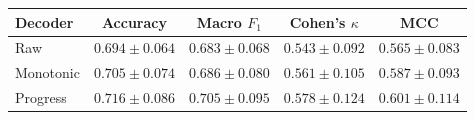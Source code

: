 \begin{tabular}{lcccc}
\toprule
Decoder & Accuracy & Macro $F_1$ & Cohen's $\kappa$ & MCC \\
\midrule
Raw & $0.694 \pm 0.064$ & $0.683 \pm 0.068$ & $0.543 \pm 0.092$ & $0.565 \pm 0.083$ \\
Monotonic & $0.705 \pm 0.074$ & $0.686 \pm 0.080$ & $0.561 \pm 0.105$ & $0.587 \pm 0.093$ \\
Progress & $0.716 \pm 0.086$ & $0.705 \pm 0.095$ & $0.578 \pm 0.124$ & $0.601 \pm 0.114$ \\
\bottomrule
\end{tabular}